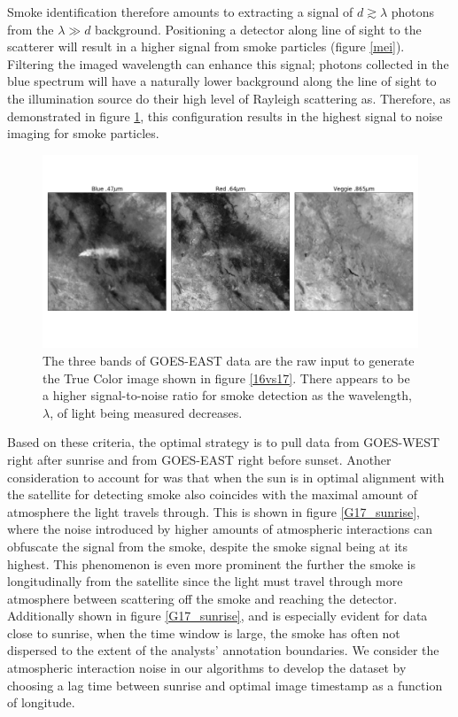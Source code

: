 \documentclass{ametsocV6.1}
\begin{document}
Smoke identification therefore amounts to extracting a signal of $d \gtrsim \lambda$ photons from the $\lambda \gg d$ background. Positioning a detector along line of sight to the scatterer will result in a higher signal from smoke particles (figure \ref{mei}). Filtering the imaged wavelength can enhance this signal; photons collected in the blue spectrum will have a naturally lower background along the line of sight to the illumination source do their high level of Rayleigh scattering as. Therefore, as demonstrated in figure \ref{bands}, this configuration results in the highest signal to noise imaging for smoke particles. 



\begin{figure}
    \centering
    \includegraphics[width=16cm]{figures/GOES16_bands.png}
    \caption{The three bands of GOES-EAST data are the raw input to generate the True Color image shown in figure \ref{16vs17}. There appears to be a higher signal-to-noise ratio for smoke detection as the wavelength, $\lambda$, of light being measured decreases.}\label{bands}
\end{figure}



Based on these criteria, the optimal strategy is to pull data from GOES-WEST right after sunrise and from GOES-EAST right before sunset. Another consideration to account for was that when the sun is in optimal alignment with the satellite for detecting smoke also coincides with the maximal amount of atmosphere the light travels through. This is shown in figure \ref{G17_sunrise}, where the noise introduced by higher amounts of atmospheric interactions can obfuscate the signal from the smoke, despite the smoke signal being at its highest. This phenomenon is even more prominent the further the smoke is longitudinally from the satellite since the light must travel through more atmosphere between scattering off the smoke and reaching the detector. Additionally shown in figure \ref{G17_sunrise}, and is especially evident for data close to sunrise, when the time window is large, the smoke has often not dispersed to the extent of the analysts' annotation boundaries. We consider the atmospheric interaction noise in our algorithms to develop the dataset by choosing a lag time between sunrise and optimal image timestamp as a function of longitude. 
\end{document}
